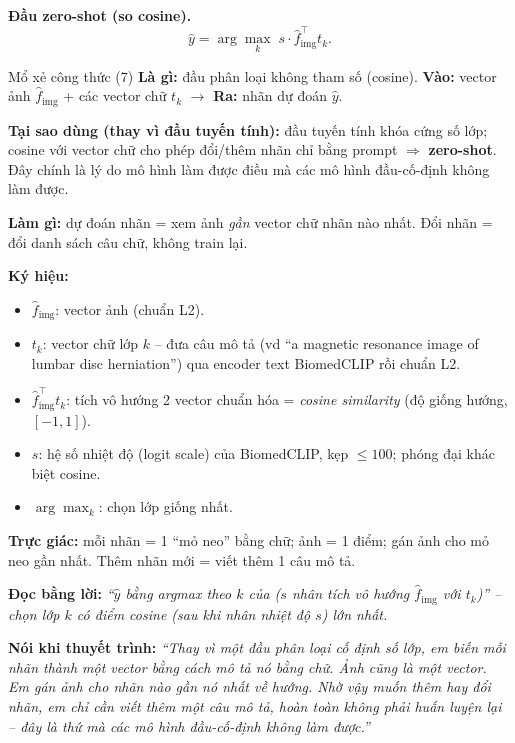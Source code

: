 \documentclass[12pt,a4paper]{article}
\begin{document}
\textbf{Đầu zero-shot (so cosine).}
\begin{equation}
\hat y=\arg\max_{k}\; s\cdot \hat f_{\text{img}}^{\top} t_k.
\label{eq:cos}
\end{equation}
\begin{ctbox}{Mổ xẻ công thức (7)}
\textbf{Là gì:} đầu phân loại không tham số (cosine). \quad\textbf{Vào:} vector ảnh $\hat f_{\text{img}}$ + các vector chữ $t_k$ $\to$ \textbf{Ra:} nhãn dự đoán $\hat y$.

\textbf{Tại sao dùng (thay vì đầu tuyến tính):} đầu tuyến tính khóa cứng số lớp; cosine với vector chữ cho phép đổi/thêm nhãn chỉ bằng prompt $\Rightarrow$ \textbf{zero-shot}. Đây chính là lý do mô hình làm được điều mà các mô hình đầu-cố-định không làm được.

\textbf{Làm gì:} dự đoán nhãn = xem ảnh \emph{gần} vector chữ nhãn nào nhất. Đổi nhãn = đổi danh sách câu chữ, không train lại.

\textbf{Ký hiệu:}
\begin{itemize}[leftmargin=1.4em,itemsep=1pt]
\item $\hat f_{\text{img}}$: vector ảnh (chuẩn L2).
\item $t_k$: vector chữ lớp $k$ -- đưa câu mô tả (vd ``a magnetic resonance image of lumbar disc herniation'') qua encoder text BiomedCLIP rồi chuẩn L2.
\item $\hat f_{\text{img}}^{\top}t_k$: tích vô hướng 2 vector chuẩn hóa = \emph{cosine similarity} (độ giống hướng, $[-1,1]$).
\item $s$: hệ số nhiệt độ (logit scale) của BiomedCLIP, kẹp $\le100$; phóng đại khác biệt cosine.
\item $\arg\max_k$: chọn lớp giống nhất.
\end{itemize}
\textbf{Trực giác:} mỗi nhãn = 1 ``mỏ neo'' bằng chữ; ảnh = 1 điểm; gán ảnh cho mỏ neo gần nhất. Thêm nhãn mới = viết thêm 1 câu mô tả.

\textbf{Đọc bằng lời:} \emph{``$\hat y$ bằng argmax theo $k$ của ($s$ nhân tích vô hướng $\hat f_{\text{img}}$ với $t_k$)'' -- chọn lớp $k$ có điểm cosine (sau khi nhân nhiệt độ $s$) lớn nhất.}

\textbf{Nói khi thuyết trình:} \emph{``Thay vì một đầu phân loại cố định số lớp, em biến mỗi nhãn thành một vector bằng cách mô tả nó bằng chữ. Ảnh cũng là một vector. Em gán ảnh cho nhãn nào gần nó nhất về hướng. Nhờ vậy muốn thêm hay đổi nhãn, em chỉ cần viết thêm một câu mô tả, hoàn toàn không phải huấn luyện lại -- đây là thứ mà các mô hình đầu-cố-định không làm được.''}
\end{ctbox}
\end{document}

